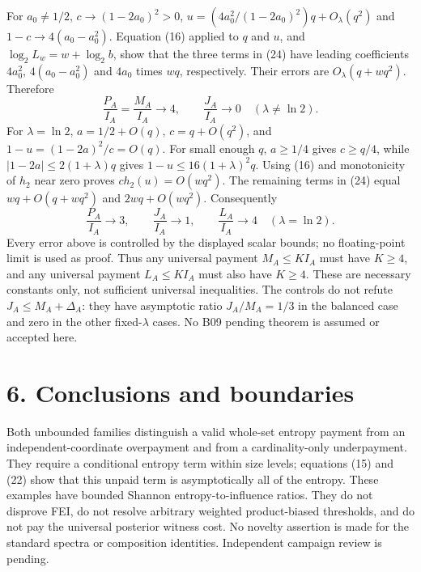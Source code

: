 \documentclass[11pt]{article}
\begin{document}
For $a_0\ne1/2$, $c\to(1-2a_0)^2>0$,
$u=(4a_0^2/(1-2a_0)^2)q+O_\lambda(q^2)$ and
$1-c\to4(a_0-a_0^2)$. Equation (16) applied to $q$ and $u$,
and $\log_2L_w=w+\log_2 b$, show that the three terms in (24)
have leading coefficients $4a_0^2$, $4(a_0-a_0^2)$ and $4a_0$
times $wq$, respectively. Their errors are
$O_\lambda(q+wq^2)$. Therefore
\[
 \frac{P_A}{I_A}=\frac{M_A}{I_A}\longrightarrow4,\qquad
 \frac{J_A}{I_A}\longrightarrow0\quad(\lambda\ne\ln2).      \tag{28}
\]
For $\lambda=\ln2$, $a=1/2+O(q)$, $c=q+O(q^2)$,
and $1-u=(1-2a)^2/c=O(q)$.
For small enough $q$, $a\ge1/4$ gives $c\ge q/4$, while
$|1-2a|\le2(1+\lambda)q$ gives
$1-u\le16(1+\lambda)^2q$. Using (16) and monotonicity of
$h_2$ near zero proves $c h_2(u)=O(wq^2)$.
The remaining terms in (24) equal $wq+O(q+wq^2)$ and
$2wq+O(wq^2)$. Consequently
\[
 \frac{P_A}{I_A}\longrightarrow3,\qquad
 \frac{J_A}{I_A}\longrightarrow1,\qquad
 \frac{L_A}{I_A}\longrightarrow4\quad(\lambda=\ln2).        \tag{29}
\]
Every error above is controlled by the displayed scalar bounds;
no floating-point limit is used as proof.
Thus any universal payment $M_A\le K I_A$ must have $K\ge4$,
and any universal payment $L_A\le K I_A$ must also have $K\ge4$.
These are necessary constants only, not sufficient universal
inequalities. The controls do not refute $J_A\le M_A+\Delta_A$:
they have asymptotic ratio $J_A/M_A=1/3$ in the balanced case
and zero in the other fixed-$\lambda$ cases. No B09 pending
theorem is assumed or accepted here.

\section*{6. Conclusions and boundaries}
Both unbounded families distinguish a valid whole-set entropy
payment from an independent-coordinate overpayment and from a
cardinality-only underpayment. They require a conditional entropy
term within size levels; equations (15) and (22) show that this
unpaid term is asymptotically all of the entropy.
These examples have bounded Shannon entropy-to-influence ratios.
They do not disprove FEI, do not resolve arbitrary weighted
product-biased thresholds, and do not pay the universal posterior
witness cost. No novelty assertion is made for the standard spectra
or composition identities. Independent campaign review is pending.
\end{document}
